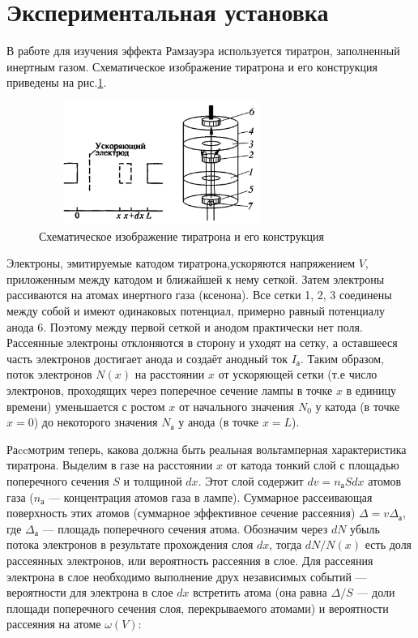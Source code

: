 \documentclass[12pt]{article}
\begin{document}
\section*{Экспериментальная установка}
\par
	В работе для изучения эффекта Рамзауэра используется тиратрон, заполненный инертным газом. Схематическое изображение тиратрона и его конструкция приведены на рис.\ref{TIR}.
\begin{figure}[h!]
	\centering
	\includegraphics[width = 8cm, height=4cm]{image1.png}
	\caption{Схематическое изображение тиратрона и его конструкция}
	\label{TIR}
\end{figure}
\par
	Электроны, эмитируемые катодом тиратрона,ускоряются напряжением $V$, приложенным между катодом и ближайшей к нему сеткой. Затем электроны рассиваются на атомах инертного газа (ксенона). Все сетки 1, 2, 3 соединены между собой и имеют одинаковых потенциал, примерно равный потенциалу анода 6. Поэтому между первой сеткой и анодом практически нет поля. Рассеянные электроны отклоняются в сторону и уходят на сетку, а оставшееся часть электронов достигает анода и создаёт анодный ток $I_\text{а}$. Таким образом, поток электронов $N(x)$ на расстоянии $x$ от ускоряющей сетки (т.е число электронов, проходящих через поперечное сечение лампы в точке $x$ в единицу времени) уменьшается с ростом $x$ от начального значения $N_0$ у катода (в точке $x = 0$) до некоторого значения $N_\text{а}$ у анода (в точке $x = L$).
\par
	Раccмотрим теперь, какова должна быть реальная вольтамперная характеристика тиратрона. Выделим в газе на расстоянии $x$ от катода тонкий слой с площадью поперечного сечения $S$  и толщиной $dx$. Этот слой содержит $dv = n_\text{а} S dx$ атомов газа ($n_\text{а}$ --- концентрация атомов газа в лампе). Суммарное рассеивающая поверхность этих атомов (суммарное эффективное сечение рассеяния) $\Delta = v \Delta_\text{а}$, где $\Delta_\text{а}$ --- площадь поперечного сечения атома. Обозначим через $dN$ убыль потока электронов в результате прохождения слоя $dx$, тогда $dN/N(x)$ есть доля рассеянных электронов, или вероятность рассеяния в слое. Для рассеяния электрона в слое необходимо выполнение друх независимых событий --- вероятности для электрона в слое $dx$ встретить атома (она равна $\Delta/S$ --- доли площади поперечного сечения слоя, перекрываемого атомами) и вероятности рассеяния на атоме $\omega(V)$:
\end{document}
